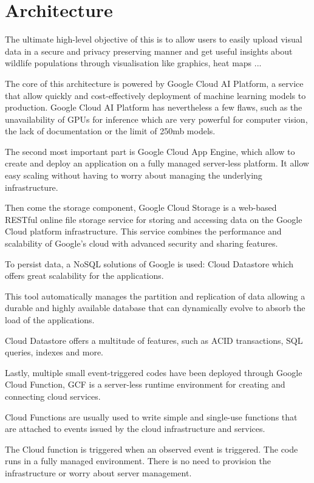 \pagebreak\section{Architecture}

The ultimate high-level objective of this is to allow users to easily upload visual data in a secure and privacy preserving manner and get useful insights about wildlife populations through visualisation like graphics, heat maps ...


The core of this architecture is powered by Google Cloud AI Platform, a service that allow quickly and cost-effectively deployment of machine learning models to production. 
Google Cloud AI Platform has nevertheless a few flaws, such as the unavailability of GPUs for inference which are very powerful for computer vision\cite{gpu_cnn}, the lack of documentation or the limit of 250mb models.

The second most important part is Google Cloud App Engine, which allow to create and deploy an application on a fully managed server-less platform. It allow easy scaling without having to worry about managing the underlying infrastructure. 

Then come the storage component, Google Cloud Storage is a web-based RESTful online file storage service for storing and accessing data on the Google Cloud platform infrastructure. This service combines the performance and scalability of Google's cloud with advanced security and sharing features.

To persist data, a NoSQL solutions of Google is used: Cloud Datastore which offers great scalability for the applications. 

This tool automatically manages the partition and replication of data allowing a durable and highly available database that can dynamically evolve to absorb the load of the applications. 

Cloud Datastore offers a multitude of features, such as ACID transactions, SQL queries, indexes and more.

Lastly, multiple small event-triggered codes have been deployed through Google Cloud Function, GCF is a server-less runtime environment for creating and connecting cloud services. 

Cloud Functions are usually used to write simple and single-use functions that are attached to events issued by the cloud infrastructure and services.

The Cloud function is triggered when an observed event is triggered. The code runs in a fully managed environment. There is no need to provision the infrastructure or worry about server management.

